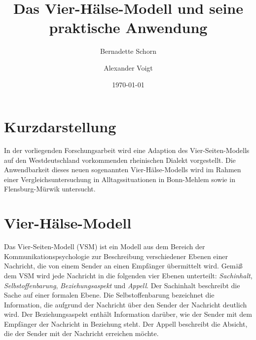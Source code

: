 \documentclass[11pt,DIV16,twocolumn]{scrartcl}
\title{Das Vier-Hälse-Modell und seine praktische Anwendung}
\author{Bernadette Schorn}
\author{Alexander Voigt}
\affil{Institut f\"{u}r Angewandte Philologie, Rheinische Universit\"{a}t Flensburg}
\date{\today}
\begin{document}
\maketitle

\section*{Kurzdarstellung}

In der vorliegenden Forschungsarbeit wird eine Adaption des
Vier-Seiten-Modells auf den Westdeutschland vorkommenden rheinischen
Dialekt vorgestellt.  Die Anwendbarkeit dieses neuen sogenannten
Vier-Hälse-Modells wird im Rahmen einer Vergleichsuntersuchung in
Alltagssituationen in Bonn-Mehlem sowie in Flensburg-Mürwik
untersucht.

\section{Vier-Hälse-Modell}

Das Vier-Seiten-Modell (VSM) \cite{VSM} ist ein Modell aus dem Bereich
der Kommunikationspsychologie zur Beschreibung verschiedener Ebenen
einer Nachricht, die von einem Sender an einen Empfänger übermittelt
wird.  Gemäß dem VSM wird jede Nachricht in die folgenden vier Ebenen
unterteilt: \textit{Sachinhalt}, \textit{Selbstoffenbarung},
\textit{Beziehungsaspekt} und \textit{Appell}.
%
Der Sachinhalt beschreibt die Sache auf einer formalen Ebene.  Die
Selbstoffenbarung bezeichnet die Information, die aufgrund der
Nachricht über den Sender der Nachricht deutlich wird.  Der
Beziehungsaspekt enthält Information darüber, wie der Sender mit dem
Empfänger der Nachricht in Beziehung steht.  Der Appell beschreibt die
Absicht, die der Sender mit der Nachricht erreichen möchte.
\end{document}
